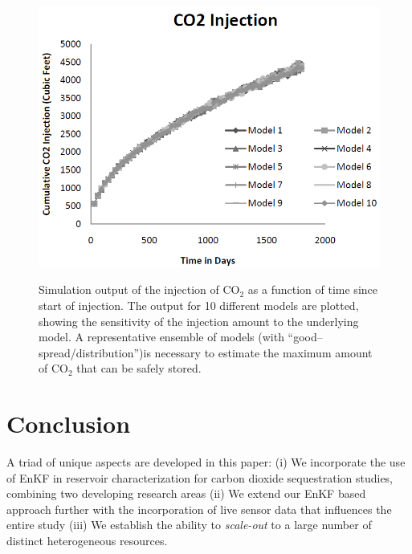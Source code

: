 \documentclass{acm_proc_article-sp}
\newcommand{\jhanote}[1]{ {\textcolor{red} { ***Jha: #1 }}}
\newcommand{\yyenote}[1]{ {\textcolor{blue} { ***yye00: #1 }}}
\newcommand{\jhanote}[1]{}
\newcommand{\yyenote}[1]{}
\begin{document}
\begin{figure}
\begin{center}\
\includegraphics[scale=0.33]{figures/CO2.png}
\end{center}
\caption[Simulation Output]{Simulation output of the injection of
  CO$_2$ as a function of time since start of injection. The output
  for 10 different models are plotted, showing the sensitivity of the
  injection amount to the underlying model. A representative ensemble
  of models (with ``good--spread/distribution'')is necessary to estimate the maximum amount of CO$_2$
  that can be safely stored.
}
\label{fig:carbon}
\end{figure}



\section{Conclusion}
A triad of unique aspects are developed in this paper: (i) We
incorporate the use of EnKF in reservoir characterization for carbon
dioxide sequestration studies, combining two developing research areas
(ii) We extend our EnKF based approach further with the incorporation of
live sensor data that influences the entire study (iii) We establish
the ability to {\it scale-out} to a large number of distinct
heterogeneous resources.
\end{document}
